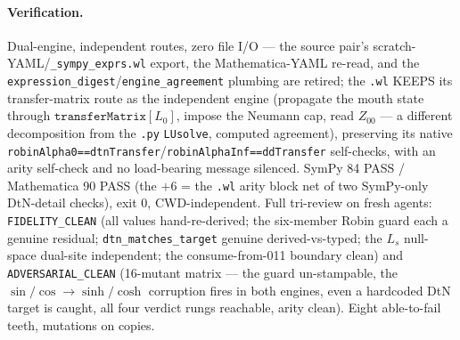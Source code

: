 \paragraph{Verification.}
Dual-engine, independent routes, zero file I/O --- the source pair's
scratch-YAML/\texttt{\_sympy\_exprs.wl} export, the Mathematica-YAML re-read, and
the \texttt{expression\_digest}/\texttt{engine\_agreement} plumbing are retired;
the \texttt{.wl} KEEPS its transfer-matrix route as the independent engine
(propagate the mouth state through \(\texttt{transferMatrix}[L_0]\), impose the
Neumann cap, read \(Z_{00}\) --- a different decomposition from the \texttt{.py}
\texttt{LUsolve}, computed agreement), preserving its native
\texttt{robinAlpha0==dtnTransfer}/\texttt{robinAlphaInf==ddTransfer} self-checks,
with an arity self-check and no load-bearing message silenced. SymPy 84 PASS /
Mathematica 90 PASS (the \(+6\) = the \texttt{.wl} arity block net of two
SymPy-only DtN-detail checks), exit 0, CWD-independent. Full tri-review on fresh
agents: \texttt{FIDELITY\_CLEAN} (all values hand-re-derived; the six-member
Robin guard each a genuine residual; \texttt{dtn\_matches\_target} genuine
derived-vs-typed; the \(L_s\) null-space dual-site independent; the
consume-from-011 boundary clean) and \texttt{ADVERSARIAL\_CLEAN} (16-mutant matrix
--- the guard un-stampable, the \(\sin/\cos\!\to\!\sinh/\cosh\) corruption fires
in both engines, even a hardcoded DtN target is caught, all four verdict rungs
reachable, arity clean). Eight able-to-fail teeth, mutations on copies.
